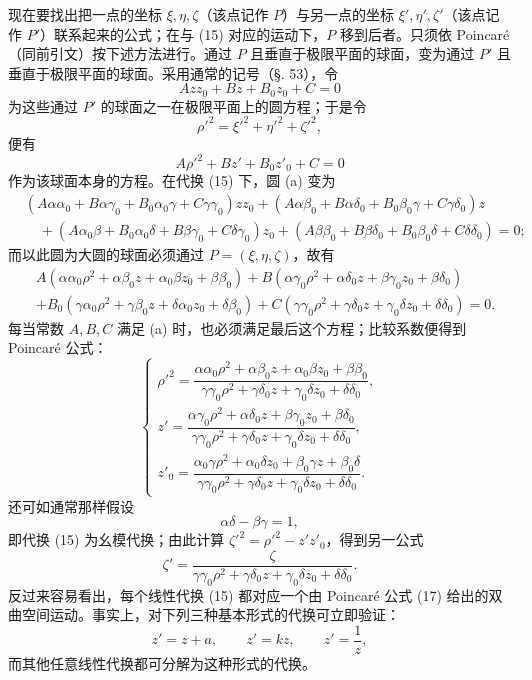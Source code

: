 现在要找出把一点的坐标 $\xi,\eta,\zeta$（该点记作 $P$）与另一点的坐标 $\xi',\eta',\zeta'$（该点记作 $P'$）联系起来的公式；在与 (15) 对应的运动下，$P$ 移到后者。只须依 Poincaré（同前引文）按下述方法进行。通过 $P$ 且垂直于极限平面的球面，变为通过 $P'$ 且垂直于极限平面的球面。采用通常的记号（§. 53），令
\[
\tag{a}
 Azz_0+Bz+B_0z_0+C=0
\]
为这些通过 $P'$ 的球面之一在极限平面上的圆方程；于是令
\[
 \rho'^2=\xi'^2+\eta'^2+\zeta'^2,
\]
便有
\[
\tag{a*}
 A\rho'^2+Bz'+B_0z'_0+C=0
\]
作为该球面本身的方程。在代换 (15) 下，圆 (a) 变为
\[
\begin{aligned}
&(A\alpha\alpha_0+B\alpha\gamma_0+B_0\alpha_0\gamma+C\gamma\gamma_0)zz_0
 +(A\alpha\beta_0+B\alpha\delta_0+B_0\beta_0\gamma+C\gamma\delta_0)z\\
&\quad +(A\alpha_0\beta+B_0\alpha_0\delta+B\beta\gamma_0+C\delta\gamma_0)z_0
 +(A\beta\beta_0+B\beta\delta_0+B_0\beta_0\delta+C\delta\delta_0)=0;
\end{aligned}
\]
而以此圆为大圆的球面必须通过 $P=(\xi,\eta,\zeta)$，故有
\[
\begin{aligned}
&A(\alpha\alpha_0\rho^2+\alpha\beta_0z+\alpha_0\beta z_0+\beta\beta_0)
+B(\alpha\gamma_0\rho^2+\alpha\delta_0z+\beta\gamma_0z_0+\beta\delta_0)\\
&+B_0(\gamma\alpha_0\rho^2+\gamma\beta_0z+\delta\alpha_0z_0+\delta\beta_0)
+C(\gamma\gamma_0\rho^2+\gamma\delta_0z+\gamma_0\delta z_0+\delta\delta_0)=0.
\end{aligned}
\]
每当常数 $A,B,C$ 满足 (a) 时，也必须满足最后这个方程；比较系数便得到 Poincaré 公式：
\[
\tag{17}
\begin{cases}
\rho'^2=\dfrac{\alpha\alpha_0\rho^2+\alpha\beta_0z+\alpha_0\beta z_0+\beta\beta_0}
{\gamma\gamma_0\rho^2+\gamma\delta_0z+\gamma_0\delta z_0+\delta\delta_0},\\[1.0em]
z'=\dfrac{\alpha\gamma_0\rho^2+\alpha\delta_0z+\beta\gamma_0z_0+\beta\delta_0}
{\gamma\gamma_0\rho^2+\gamma\delta_0z+\gamma_0\delta z_0+\delta\delta_0},\\[1.0em]
z'_0=\dfrac{\alpha_0\gamma\rho^2+\alpha_0\delta z_0+\beta_0\gamma z+\beta_0\delta}
{\gamma\gamma_0\rho^2+\gamma\delta_0z+\gamma_0\delta z_0+\delta\delta_0}.
\end{cases}
\]
还可如通常那样假设
\[
 \alpha\delta-\beta\gamma=1,
\]
即代换 (15) 为幺模代换；由此计算 $\zeta'^2=\rho'^2-z'z'_0$，得到另一公式
\[
\tag{17*}
 \zeta'=\frac{\zeta}{\gamma\gamma_0\rho^2+\gamma\delta_0z+\gamma_0\delta z_0+\delta\delta_0}.
\]
反过来容易看出，每个线性代换 (15) 都对应一个由 Poincaré 公式 (17) 给出的双曲空间运动。事实上，对下列三种基本形式的代换可立即验证：
\[
 z'=z+a,
 \qquad z'=kz,
 \qquad z'=\frac1z,
\]
而其他任意线性代换都可分解为这种形式的代换。
